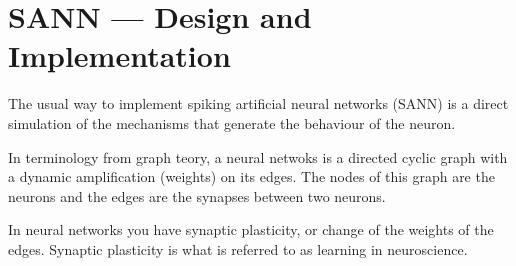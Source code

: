 

%













\section{SANN --- Design and Implementation}
\label{secSANN} 


	The usual way to implement spiking artificial neural networks (SANN) is a direct simulation of the mechanisms that generate the behaviour of the neuron.
	
	In terminology from graph teory, a neural netwoks is a directed cyclic graph with a dynamic amplification (weights) on its edges.
	The nodes of this graph are the neurons and the edges are the synapses between two neurons.%

	In neural networks you have synaptic plasticity, or change of the weights of the edges. Synaptic plasticity is what is referred to as learning in neuroscience. %


